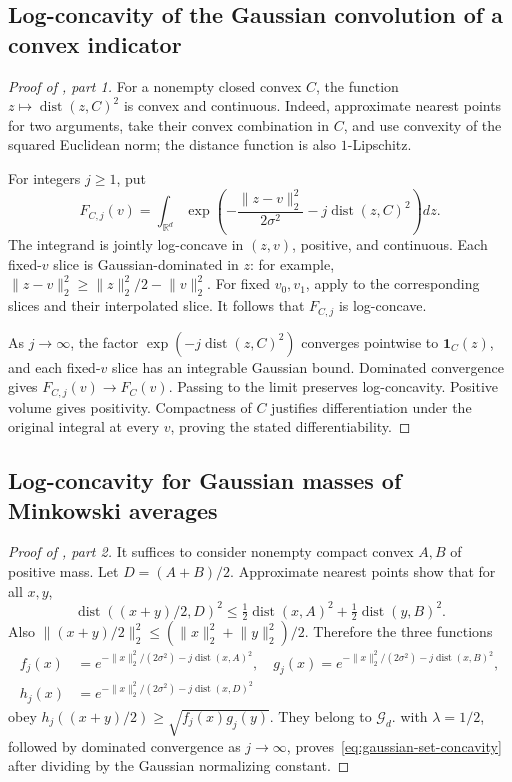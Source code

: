 \documentclass[11pt,a4paper]{article}
\newcommand{\R}{\mathbb R}
\newcommand{\norm}[1]{\lVert #1\rVert}
\DeclareMathOperator{\dist}{dist}
\theoremstyle{definition}
\theoremstyle{remark}
\begin{document}
\subsection{Log-concavity of the Gaussian convolution of a convex indicator}
\begin{proof}[Proof of , part 1]
For a nonempty closed convex $C$, the function $z\mapsto\dist(z,C)^2$ is convex and continuous. Indeed, approximate nearest points for two arguments, take their convex combination in $C$, and use convexity of the squared Euclidean norm; the distance function is also $1$-Lipschitz.

For integers $j\ge1$, put
\[
 F_{C,j}(v)=\int_{\R^d}
 \exp\left(-\frac{\norm{z-v}_2^2}{2\sigma^2}-j\dist(z,C)^2\right)dz.
\]
The integrand is jointly log-concave in $(z,v)$, positive, and continuous. Each fixed-$v$ slice is Gaussian-dominated in $z$: for example,
$\norm{z-v}_2^2\ge\norm{z}_2^2/2-\norm{v}_2^2$.
For fixed $v_0,v_1$, apply  to the corresponding slices and their interpolated slice. It follows that $F_{C,j}$ is log-concave.

As $j\to\infty$, the factor $\exp(-j\dist(z,C)^2)$ converges pointwise to $\mathbf1_C(z)$, and each fixed-$v$ slice has an integrable Gaussian bound. Dominated convergence gives $F_{C,j}(v)\to F_C(v)$. Passing to the limit preserves log-concavity. Positive volume gives positivity. Compactness of $C$ justifies differentiation under the original integral at every $v$, proving the stated differentiability.
\end{proof}

\subsection{Log-concavity for Gaussian masses of Minkowski averages}
\begin{proof}[Proof of , part 2]
It suffices to consider nonempty compact convex $A,B$ of positive mass. Let $D=(A+B)/2$. Approximate nearest points show that for all $x,y$,
\[
 \dist((x+y)/2,D)^2
 \le\tfrac12\dist(x,A)^2+\tfrac12\dist(y,B)^2.
\]
Also $\norm{(x+y)/2}_2^2\le(\norm{x}_2^2+\norm{y}_2^2)/2$. Therefore the three functions
\[
\begin{aligned}
 f_j(x)&=e^{-\norm{x}_2^2/(2\sigma^2)-j\dist(x,A)^2},\quad
 g_j(x)=e^{-\norm{x}_2^2/(2\sigma^2)-j\dist(x,B)^2},\\
 h_j(x)&=e^{-\norm{x}_2^2/(2\sigma^2)-j\dist(x,D)^2}
\end{aligned}
\]
obey $h_j((x+y)/2)\ge\sqrt{f_j(x)g_j(y)}$. They belong to $\mathcal G_d$.  with $\lambda=1/2$, followed by dominated convergence as $j\to\infty$, proves~\eqref{eq:gaussian-set-concavity} after dividing by the Gaussian normalizing constant.
\end{proof}
\end{document}
